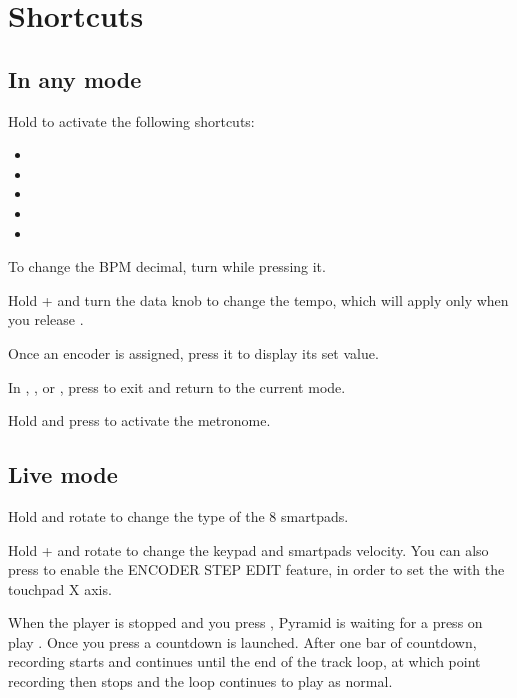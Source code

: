 \chapter{Shortcuts}

\section{In any mode}

Hold  to activate the following shortcuts:

\begin{itemize}
\item {}
\item {}
\item {}
\item {}
\item {}
\end{itemize}

To change the BPM decimal, turn \encodericon{} while pressing it.

Hold  +  and turn the data knob \encodericon{} to change the tempo, which will apply only when you release .

Once an encoder is assigned, press it to display its set value.

In , ,  or , press  to exit and return to the current mode.

Hold  and press  to activate the metronome.


\section{Live mode}

Hold  and rotate \encodericon{} to change the type of the 8 smartpads.

Hold  +  and rotate \encodericon{} to change the keypad and smartpads velocity. You can also press  to enable the ENCODER STEP EDIT feature, in order to set the  with the touchpad X axis.

When the player is stopped \stopicon{} and you press , Pyramid is waiting for a press on play \playicon{}. Once you press \playicon{} a countdown is launched. After one bar of countdown, recording starts and continues until the end of the track loop, at which point recording then stops and the loop continues to play as normal.

